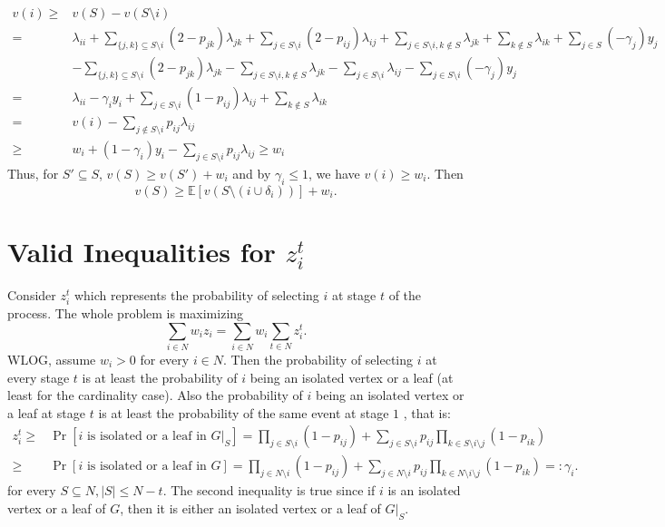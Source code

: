 \documentclass[10pt,leqno]{amsart}
\newcommand{\E}{\mathbb{E}}
\begin{document}
\begin{align*}
  v(i)\geq &v(S)-v(S\setminus i)\\
  =&\lambda_{ii}+\sum_{\{j,k\}\subseteq S\setminus i}(2-p_{jk})\lambda_{jk}+\sum_{j\in S\setminus i}(2-p_{ij})\lambda_{ij}+\sum_{j\in S\setminus i,k\notin S}\lambda_{jk}+\sum_{k\notin S}\lambda_{ik}+\sum_{j\in S}(-\gamma_j)y_j\\
  &-\sum_{\{j,k\}\subseteq S\setminus i}(2-p_{jk})\lambda_{jk}-\sum_{j\in S\setminus i,k\notin S}\lambda_{jk}-\sum_{j\in S\setminus i}\lambda_{ij}-\sum_{j\in S\setminus i}(-\gamma_j)y_j\\
  =&\lambda_{ii}-\gamma_iy_i+\sum_{j\in S\setminus i}(1-p_{ij})\lambda_{ij}+\sum_{k\notin S}\lambda_{ik}\\
  =&v(i)-\sum_{j\notin S\setminus i}p_{ij}\lambda_{ij}\\
  \geq &w_i+(1-\gamma_i)y_i-\sum_{j\in S\setminus i}p_{ij}\lambda_{ij}\geq w_i
\end{align*}
Thus, for $S'\subseteq S$, $v(S)\geq v(S')+w_i$ and by $\gamma_i\leq 1$, we have
$v(i)\geq w_i$. Then
\[v(S)\geq \E[v(S\setminus (i\cup\delta_i))]+w_i.       \]
\section{Valid Inequalities for $z_i^t$}
Consider $z_i^t$ which represents the probability of selecting $i$ at stage $t$ of the process.
The whole problem is maximizing
\[\sum_{i\in N}w_iz_i=\sum_{i\in N}w_i\sum_{t\in N}z_i^t.\]
WLOG, assume $w_i>0$ for every $i\in N$. Then the probability of selecting $i$ at every stage $t$ is at least the probability of $i$ being an isolated vertex or a leaf (at least for the cardinality case).
Also the probability of $i$ being an isolated vertex or a leaf at stage $t$ is at least the probability of the same event at stage $1$
, that is:
\begin{align*}
  z_i^t\geq &\Pr[i\text{ is isolated or a leaf in }G|_S]=\prod_{j\in S\setminus i}(1-p_{ij})+\sum_{j\in S\setminus i}p_{ij}\prod_{k\in S\setminus i\setminus j}(1-p_{ik})\\
  \geq &\Pr[i\text{ is isolated or a leaf in }G]=\prod_{j\in N\setminus i}(1-p_{ij})+\sum_{j\in N\setminus i}p_{ij}\prod_{k\in N\setminus i\setminus j}(1-p_{ik})=:\gamma_i.
\end{align*}
for every $S\subseteq N, |S|\leq N-t$.
The second inequality is true since if $i$ is an isolated vertex or a leaf of $G$, then it is either an isolated vertex or a leaf of $G|_S$.
\end{document}
